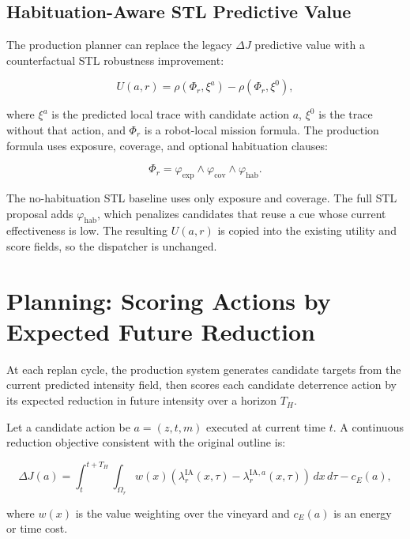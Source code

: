 \subsection{Habituation-Aware STL Predictive Value}

The production planner can replace the legacy $\Delta J$ predictive value with a counterfactual STL robustness improvement:

\begin{equation}
U(a,r)
=
\rho(\Phi_r,\xi^{a}) - \rho(\Phi_r,\xi^{0}),
\end{equation}

where $\xi^{a}$ is the predicted local trace with candidate action $a$, $\xi^{0}$ is the trace without that action, and $\Phi_r$ is a robot-local mission formula. The production formula uses exposure, coverage, and optional habituation clauses:

\begin{equation}
\Phi_r = \varphi_{\mathrm{exp}} \wedge \varphi_{\mathrm{cov}} \wedge \varphi_{\mathrm{hab}}.
\end{equation}

The no-habituation STL baseline uses only exposure and coverage. The full STL proposal adds $\varphi_{\mathrm{hab}}$, which penalizes candidates that reuse a cue whose current effectiveness is low. The resulting $U(a,r)$ is copied into the existing utility and score fields, so the dispatcher is unchanged.
\section{Planning: Scoring Actions by Expected Future Reduction}

At each replan cycle, the production system generates candidate targets from the current predicted intensity field, then scores each candidate deterrence action by its expected reduction in future intensity over a horizon $T_H$.

Let a candidate action be $a=(z,t,m)$ executed at current time $t$. A continuous reduction objective consistent with the original outline is:

\begin{equation}
\Delta J(a)
=
\int_t^{t+T_H}\int_{\Omega_r}
w(x)\left(
\lambda_r^{\mathrm{IA}}(x,\tau)
-
\lambda_r^{\mathrm{IA},a}(x,\tau)
\right)\,dx\,d\tau
- c_E(a),
\end{equation}

where $w(x)$ is the value weighting over the vineyard and $c_E(a)$ is an energy or time cost.

